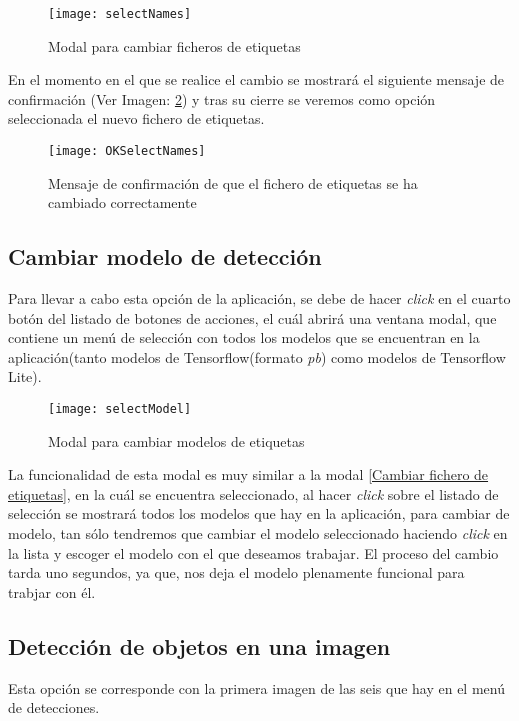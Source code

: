 \begin{figure}[!h]
    \centering
    \texttt{[image: selectNames]}
    \caption{Modal para cambiar ficheros de etiquetas}\label{fig:selectNames}
\end{figure}

En el momento en el que se realice el cambio se mostrará el siguiente mensaje de confirmación (Ver Imagen: \ref{fig:OKSelectNames}) y tras su cierre se veremos como opción seleccionada el nuevo fichero de etiquetas.

\begin{figure}[!h]
    \centering
    \texttt{[image: OKSelectNames]}
    \caption{Mensaje de confirmación de que el fichero de etiquetas se ha cambiado correctamente}\label{fig:OKSelectNames}
\end{figure}

\subsection{Cambiar modelo de detección}
Para llevar a cabo esta opción de la aplicación, se debe de hacer \textit{click} en el cuarto botón del listado de botones de acciones, el cuál abrirá una ventana modal, que contiene un menú de selección con todos los modelos que se encuentran en la aplicación(tanto modelos de Tensorflow(formato \textit{pb}) como modelos de Tensorflow Lite).

\begin{figure}[!h]
    \centering
    \texttt{[image: selectModel]}
    \caption{Modal para cambiar modelos de etiquetas}\label{fig:selectModel}
\end{figure}

La funcionalidad de esta modal es muy similar a la modal \ref{Cambiar fichero de etiquetas}, en la cuál se encuentra seleccionado, al hacer \textit{click} sobre el listado de selección se mostrará todos los modelos que hay en la aplicación, para cambiar de modelo, tan sólo tendremos que cambiar el modelo seleccionado haciendo \textit{click} en la lista y escoger el modelo con el que deseamos trabajar.
El proceso del cambio tarda uno segundos, ya que, nos deja el modelo plenamente funcional para trabjar con él.

\subsection{Detección de objetos en una imagen} \label{od_img}
Esta opción se corresponde con la primera imagen de las seis que hay en el menú de detecciones.

